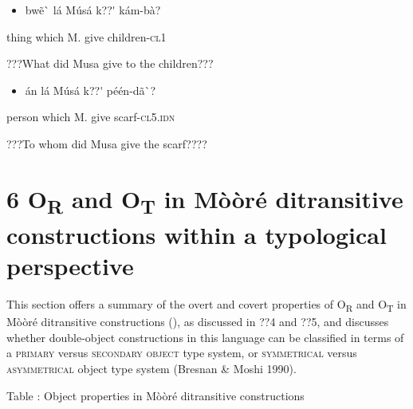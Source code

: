 \documentclass[output=paper]{langsci/langscibook}
\begin{document}
{{{{{{{\begin{itemize}
\item \begin{styleNumberedEX}
bw\~{e}\`{ }    l\'{a}    M\'{u}s\'{a}  k??\'{ }  k\'{a}m-b\`{a}?
\end{styleNumberedEX}\end{itemize}
\begin{styleGloss}
thing    which    M.  give  children-\textsc{cl1}
\end{styleGloss}

\begin{styleTranslation}
???What did Musa give to the children???
\end{styleTranslation}

\begin{itemize}
\item \begin{styleNumberedEX}
\'{a}n    l\'{a}    M\'{u}s\'{a}  k??\'{ }  p\'{e}\'{e}n-d\~{a}\`{ }?
\end{styleNumberedEX}\end{itemize}
\begin{styleGloss}
person  which    M.  give  scarf-\textsc{cl5.idn}
\end{styleGloss}

\begin{styleTranslation}
???To whom did Musa give the scarf????
\end{styleTranslation}

\chapter[6 OR and OT in Mo\`{ }o\`{ }re\'{ } ditransitive constructions within a typological perspective]{6 O\textsubscript{R} and O\textsubscript{T} in M\`{o}\`{o}r\'{e} ditransitive constructions within a typological perspective}

This section offers a summary of the overt and covert properties of O\textsubscript{R} and O\textsubscript{T} in M\`{o}\`{o}r\'{e} ditransitive constructions (), as discussed in ??4 and ??5, and discusses whether double-object constructions in this language can be classified in terms of a \textsc{primary} versus \textsc{secondary object }\citep{Dryer1986} type system, or \textsc{symmetrical} versus \textsc{asymmetrical} object type system (Bresnan \& Moshi 1990).

\begin{styleTabellenberschrift}
\label{bkm:Ref444780947}Table : Object properties in M\`{o}\`{o}r\'{e} ditransitive constructions
\end{styleTabellenberschrift}

}}}}}}}
\end{document}

